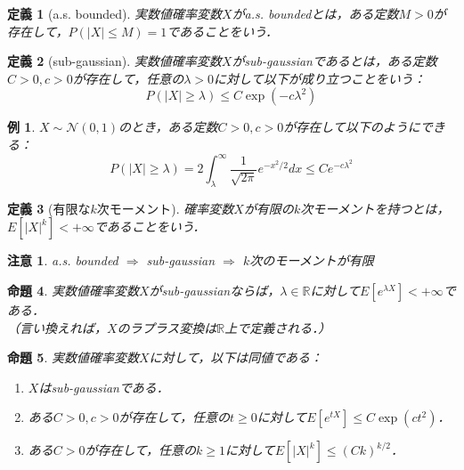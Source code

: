\documentclass{ltjsarticle}
\theoremstyle{mystyle1}
\newtheorem{dfn}{定義}[section]
\newtheorem{prop}[dfn]{命題}
\theoremstyle{mystyle2}
\newtheorem{example}{例}
\newtheorem{note*}{注意}
\theoremstyle{mystyle3}
\begin{document}
\begin{dfn}[a.s. bounded]
    実数値確率変数$X$がa.s. boundedとは，ある定数$M>0$が存在して，$P(|X|\leq M)=1$であることをいう．
\end{dfn}

\begin{dfn}[sub-gaussian]
    実数値確率変数$X$がsub-gaussianであるとは，ある定数$C>0,c>0$が存在して，任意の$\lambda>0$に対して以下が成り立つことをいう：
    \begin{equation}
        P(|X|\geq\lambda)\leq C\exp(-c\lambda^2)
    \end{equation}
\end{dfn}

\begin{example}
    $X\sim\mathcal{N}(0,1)$のとき，ある定数$C>0,c>0$が存在して以下のようにできる：
    \begin{equation}
        P(|X|\geq\lambda)=2\int_\lambda^\infty \frac{1}{\sqrt{2\pi}}e^{-x^2/2}dx\leq Ce^{-c\lambda^2}
    \end{equation}
\end{example}

\begin{dfn}[有限な$k$次モーメント]
    確率変数$X$が有限の$k$次モーメントを持つとは，$E[|X|^k]<+\infty$であることをいう．
\end{dfn}

\begin{note*}
    a.s. bounded $\Rightarrow$ sub-gaussian $\Rightarrow$ $k$次のモーメントが有限
\end{note*}

\begin{prop}
    実数値確率変数$X$がsub-gaussianならば，$\lambda\in\mathbb{R}$に対して$E[e^{\lambda X}]<+\infty$である．\\（言い換えれば，$X$のラプラス変換は$\mathbb{R}$上で定義される．）
\end{prop}

\begin{prop}
    実数値確率変数$X$に対して，以下は同値である：
    \begin{enumerate}
        \item $X$はsub-gaussianである．
        \item ある$C>0,c>0$が存在して，任意の$t\geq 0$に対して$E[e^{tX}]\leq C\exp(ct^2)$．
        \item ある$C>0$が存在して，任意の$k\geq 1$に対して$E[|X|^k]\leq(Ck)^{k/2}$．
    \end{enumerate}
\end{prop}
\end{document}
